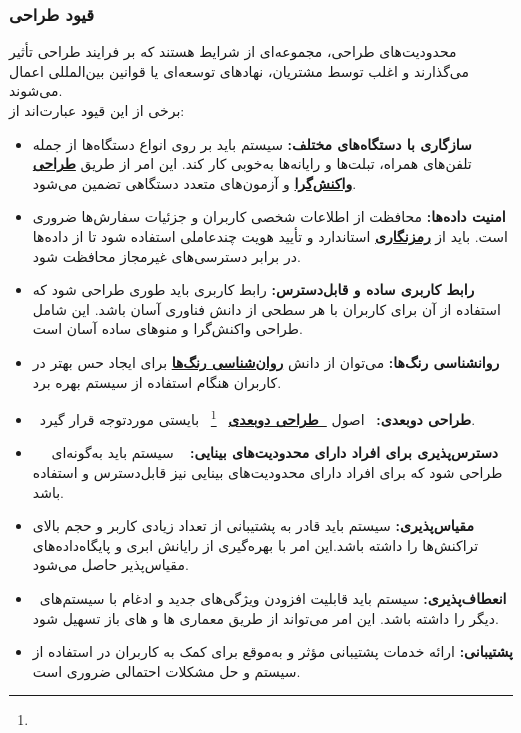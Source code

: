 \documentclass[12pt,a4paper,oneside]{article}
\begin{document}
			 \subsubsection{قیود طراحی}
			 محدودیت‌های طراحی، مجموعه‌ای از شرایط هستند که بر فرایند طراحی تأثیر می‌گذارند و اغلب توسط مشتریان، نهادهای توسعه‌ای یا قوانین بین‌المللی اعمال می‌شوند.
			 \\
			 برخی از این قیود عبارت‌اند از:
			 \begin{itemize}
				 \item 
				 \textbf{سازگاری با دستگاه‌های مختلف:}
				 سیستم باید بر روی انواع دستگاه‌ها از جمله تلفن‌های همراه، تبلت‌ها و رایانه‌ها به‌خوبی کار کند. این امر از طریق 
				 \hyperref[ref:responsivedesign]{\textbf{طراحی واکنش‌گرا}}
				  و آزمون‌های متعدد دستگاهی تضمین می‌شود.
				 
				 \item 
				 \textbf{امنیت داده‌ها:}
				 محافظت از اطلاعات شخصی کاربران و جزئیات سفارش‌ها ضروری است. باید از 
				 \hyperref[ref:encryption]{\textbf{رمزنگاری}}
				  استاندارد و تأیید هویت چندعاملی استفاده شود تا از داده‌ها در برابر دسترسی‌های غیرمجاز محافظت شود.
				 
				 \item 
				 \textbf{رابط کاربری ساده و قابل‌دسترس:}
				 رابط کاربری باید طوری طراحی شود که استفاده از آن برای کاربران با هر سطحی از دانش فناوری آسان باشد. این شامل طراحی واکنش‌گرا و منوهای ساده آسان است.
				 
				 \item 
				 \textbf{روانشناسی رنگ‌ها:}
 می‌توان از دانش 
 \hyperref[ref:colorpsychology]{\textbf{روان‌شناسی رنگ‌ها}}
  برای ایجاد حس بهتر در کاربران هنگام استفاده از سیستم بهره برد.
				  
				  \item
				  \textbf{طراحی دوبعدی:}
				  اصول
				 \hyperref[ref:flatdesign]{\textbf{ طراحی دوبعدی}}
				  \footnote{}
				  بایستی موردتوجه قرار گیرد.
				    
				  \item   
				  \textbf{دسترس‌پذیری برای افراد دارای محدودیت‌های بینایی:}
				   سیستم باید به‌گونه‌ای طراحی شود که برای افراد دارای محدودیت‌های بینایی نیز قابل‌دسترس و استفاده باشد.
				   
				  \item 
				  \textbf{مقیاس‌پذیری:}
 سیستم باید قادر به پشتیبانی از تعداد زیادی کاربر و حجم بالای تراکنش‌ها را داشته باشد.این امر با بهره‌گیری از رایانش ابری و پایگاه‌داده‌های مقیاس‌پذیر حاصل می‌شود.
				   
				  \item 
				  \textbf{انعطاف‌پذیری:}
سیستم باید قابلیت افزودن ویژگی‌های جدید و ادغام با سیستم‌های دیگر را داشته باشد. این امر می‌تواند از طریق معماری ‌ها و های باز تسهیل شود.

				 \item 
				 \textbf{پشتیبانی:}
 ارائه خدمات پشتیبانی مؤثر و به‌موقع برای کمک به کاربران در استفاده از سیستم و حل مشکلات احتمالی ضروری است.
			 \end{itemize}
\end{document}
